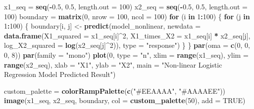 \documentclass[
]{article}
\newenvironment{Shaded}{\begin{snugshade}}{\end{snugshade}}
\newcommand{\AttributeTok}[1]{\textcolor[rgb]{0.13,0.29,0.53}{#1}}
\newcommand{\ConstantTok}[1]{\textcolor[rgb]{0.56,0.35,0.01}{#1}}
\newcommand{\ControlFlowTok}[1]{\textcolor[rgb]{0.13,0.29,0.53}{\textbf{#1}}}
\newcommand{\DecValTok}[1]{\textcolor[rgb]{0.00,0.00,0.81}{#1}}
\newcommand{\FloatTok}[1]{\textcolor[rgb]{0.00,0.00,0.81}{#1}}
\newcommand{\FunctionTok}[1]{\textcolor[rgb]{0.13,0.29,0.53}{\textbf{#1}}}
\newcommand{\NormalTok}[1]{#1}
\newcommand{\OtherTok}[1]{\textcolor[rgb]{0.56,0.35,0.01}{#1}}
\newcommand{\SpecialCharTok}[1]{\textcolor[rgb]{0.81,0.36,0.00}{\textbf{#1}}}
\newcommand{\StringTok}[1]{\textcolor[rgb]{0.31,0.60,0.02}{#1}}
\begin{document}
\begin{Shaded}
\begin{Highlighting}[]
\NormalTok{x1\_seq }\OtherTok{=} \FunctionTok{seq}\NormalTok{(}\SpecialCharTok{{-}}\FloatTok{0.5}\NormalTok{, }\FloatTok{0.5}\NormalTok{, }\AttributeTok{length.out =} \DecValTok{100}\NormalTok{)}
\NormalTok{x2\_seq }\OtherTok{=} \FunctionTok{seq}\NormalTok{(}\SpecialCharTok{{-}}\FloatTok{0.5}\NormalTok{, }\FloatTok{0.5}\NormalTok{, }\AttributeTok{length.out =} \DecValTok{100}\NormalTok{)}
\NormalTok{boundary }\OtherTok{=} \FunctionTok{matrix}\NormalTok{(}\DecValTok{0}\NormalTok{, }\AttributeTok{nrow =} \DecValTok{100}\NormalTok{, }\AttributeTok{ncol =} \DecValTok{100}\NormalTok{)}
\ControlFlowTok{for}\NormalTok{ (i }\ControlFlowTok{in} \DecValTok{1}\SpecialCharTok{:}\DecValTok{100}\NormalTok{) \{}
  \ControlFlowTok{for}\NormalTok{ (j }\ControlFlowTok{in} \DecValTok{1}\SpecialCharTok{:}\DecValTok{100}\NormalTok{) \{}
\NormalTok{    boundary[i, j] }\OtherTok{\textless{}{-}} \FunctionTok{predict}\NormalTok{(model\_nonlinear, }\AttributeTok{newdata =} \FunctionTok{data.frame}\NormalTok{(}\AttributeTok{X1\_squared =}\NormalTok{ x1\_seq[i]}\SpecialCharTok{\^{}}\DecValTok{2}\NormalTok{, }\AttributeTok{X1\_times\_X2 =}\NormalTok{ x1\_seq[i] }\SpecialCharTok{*}\NormalTok{ x2\_seq[j], }\AttributeTok{log\_X2\_squared =} \FunctionTok{log}\NormalTok{(x2\_seq[j]}\SpecialCharTok{\^{}}\DecValTok{2}\NormalTok{)), }\AttributeTok{type =} \StringTok{"response"}\NormalTok{)}
\NormalTok{  \}}
\NormalTok{\}}
\FunctionTok{par}\NormalTok{(}\AttributeTok{oma =} \FunctionTok{c}\NormalTok{(}\DecValTok{0}\NormalTok{, }\DecValTok{0}\NormalTok{, }\DecValTok{0}\NormalTok{, }\DecValTok{8}\NormalTok{)) }
\FunctionTok{par}\NormalTok{(}\AttributeTok{family =} \StringTok{"mono"}\NormalTok{)}
\FunctionTok{plot}\NormalTok{(}\DecValTok{0}\NormalTok{, }\AttributeTok{type =} \StringTok{"n"}\NormalTok{, }\AttributeTok{xlim =} \FunctionTok{range}\NormalTok{(x1\_seq), }\AttributeTok{ylim =} \FunctionTok{range}\NormalTok{(x2\_seq), }\AttributeTok{xlab =} \StringTok{"X1"}\NormalTok{, }\AttributeTok{ylab =} \StringTok{"X2"}\NormalTok{, }\AttributeTok{main =} \StringTok{"Non{-}linear Logistic Regression Model Predicted Result"}\NormalTok{)}

\NormalTok{custom\_palette }\OtherTok{=} \FunctionTok{colorRampPalette}\NormalTok{(}\FunctionTok{c}\NormalTok{(}\StringTok{"\#EEAAAA"}\NormalTok{, }\StringTok{"\#AAAAEE"}\NormalTok{))}
\FunctionTok{image}\NormalTok{(x1\_seq, x2\_seq, boundary, }\AttributeTok{col =} \FunctionTok{custom\_palette}\NormalTok{(}\DecValTok{50}\NormalTok{), }\AttributeTok{add =} \ConstantTok{TRUE}\NormalTok{)}


\end{Highlighting}
\end{Shaded}
\end{document}
